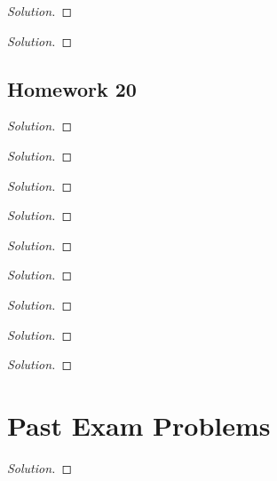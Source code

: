 \begin{problem}
\end{problem}
\begin{proof}[Solution]
\end{proof}

\begin{problem}
\end{problem}
\begin{proof}[Solution]
\end{proof}


\section{Homework 20}
\begin{problem}
\end{problem}
\begin{proof}[Solution]
\end{proof}

\begin{problem}
\end{problem}
\begin{proof}[Solution]
\end{proof}

\begin{problem}
\end{problem}
\begin{proof}[Solution]
\end{proof}

\begin{problem}
\end{problem}
\begin{proof}[Solution]
\end{proof}

\begin{problem}
\end{problem}
\begin{proof}[Solution]
\end{proof}

\begin{problem}
\end{problem}
\begin{proof}[Solution]
\end{proof}

\begin{problem}
\end{problem}
\begin{proof}[Solution]
\end{proof}

\begin{problem}
\end{problem}
\begin{proof}[Solution]
\end{proof}

\begin{problem}
\end{problem}
\begin{proof}[Solution]
\end{proof}

\chapter{Past Exam Problems}
\begin{problem}
\end{problem}
\begin{proof}[Solution]
\end{proof}

